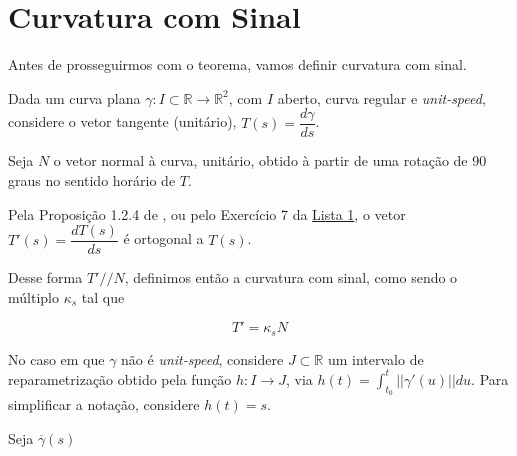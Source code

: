 \documentclass[12pt,letterpaper]{article}
\newcommand{\real}{\mathbb{R}}
\newcommand{\rr}{\mathbb{R}^2}
\begin{document}
	\newpage
	\section{Curvatura com Sinal}
	
	Antes de prosseguirmos com o teorema, vamos definir curvatura com sinal.
	
	Dada um curva plana $\gamma:I\subset\real\to\rr$, com $I$ aberto, curva regular e \textit{unit-speed}, considere o vetor tangente (unitário), $T(s)=\dfrac{d\gamma}{ds}$.
	
	Seja $N$ o vetor normal à curva, unitário, obtido à partir de uma rotação de 90 graus no sentido horário de $T$.
	
	Pela Proposição 1.2.4 de \cite{pressley2001elementary}, ou pelo Exercício 7 da \href{https://github.com/reneroliveira/Curves_and_Surfaces/blob/main/lists/list1.pdf}{Lista 1}, o vetor $T'(s)=\dfrac{dT(s)}{ds}$ é ortogonal a $T(s)$.
	
	Desse forma $T'//N$, definimos então a curvatura com sinal, como sendo o múltiplo $\kappa_s$ tal que 
	
	$$T'=\kappa_sN$$
	
	No caso em que $\gamma$ não é \textit{unit-speed}, considere $J\subset\real$ um intervalo de reparametrização obtido pela função $h:I\to J$, via $h(t)=\int_{t_0}^t||\gamma'(u)||du$. Para simplificar a notação, considere $h(t)=s$.
	
	Seja $\overline{\gamma}(s)$
	
	\newpage
	\printbibliography
\end{document}
